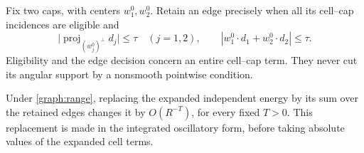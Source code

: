 Fix two caps, with centers $w_1^0,w_2^0$.  Retain an edge precisely when
all its cell--cap incidences are eligible and
\begin{equation}\label{graph:retained-tests}
 \big|\operatorname{proj}_{(w_j^0)^\perp}d_j\big|\le\tau
 \quad(j=1,2),\qquad
 |w_1^0\cdot d_1+w_2^0\cdot d_2|\le\tau.
\end{equation}
Eligibility and the edge decision concern an entire cell--cap term.
They never cut its angular support by a nonsmooth pointwise condition.

\begin{lemma}\label{graph:localization}
Under \eqref{graph:range}, replacing the expanded independent energy by its
sum over the retained edges changes it by $O(R^{-T})$, for every fixed
$T>0$.  This replacement is made in the integrated oscillatory form,
before taking absolute values of the expanded cell terms.
\end{lemma}

